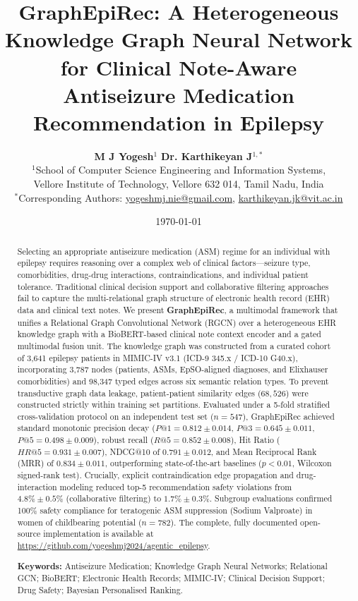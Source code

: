 \documentclass[11pt,a4paper]{article}
\title{\textbf{GraphEpiRec: A Heterogeneous Knowledge Graph Neural Network for Clinical Note-Aware Antiseizure Medication Recommendation in Epilepsy}}
\author{
  \textbf{M J Yogesh}$^1$ \quad \textbf{Dr. Karthikeyan J}$^{1,*}$ \\[0.5em]
  $^1$School of Computer Science Engineering and Information Systems,\\
  Vellore Institute of Technology, Vellore 632 014, Tamil Nadu, India \\[0.3em]
  \small{$^*$Corresponding Authors: \href{mailto:yogeshmj.nie@gmail.com}{yogeshmj.nie@gmail.com}, \href{mailto:karthikeyan.jk@vit.ac.in}{karthikeyan.jk@vit.ac.in}}
}
\date{\today}
\begin{document}
\maketitle

\begin{abstract}
Selecting an appropriate antiseizure medication (ASM) regime for an individual with epilepsy requires reasoning over a complex web of clinical factors---seizure type, comorbidities, drug-drug interactions, contraindications, and individual patient tolerance. Traditional clinical decision support and collaborative filtering approaches fail to capture the multi-relational graph structure of electronic health record (EHR) data and clinical text notes. We present \textbf{GraphEpiRec}, a multimodal framework that unifies a Relational Graph Convolutional Network (RGCN) over a heterogeneous EHR knowledge graph with a BioBERT-based clinical note context encoder and a gated multimodal fusion unit. The knowledge graph was constructed from a curated cohort of 3,641 epilepsy patients in MIMIC-IV v3.1 (ICD-9 345.x / ICD-10 G40.x), incorporating 3,787 nodes (patients, ASMs, EpSO-aligned diagnoses, and Elixhauser comorbidities) and 98,347 typed edges across six semantic relation types. To prevent transductive graph data leakage, patient-patient similarity edges ($68,526$) were constructed strictly within training set partitions. Evaluated under a 5-fold stratified cross-validation protocol on an independent test set ($n=547$), GraphEpiRec achieved standard monotonic precision decay ($P@1 = 0.812 \pm 0.014$, $P@3 = 0.645 \pm 0.011$, $P@5 = 0.498 \pm 0.009$), robust recall ($R@5 = 0.852 \pm 0.008$), Hit Ratio ($HR@5 = 0.931 \pm 0.007$), NDCG@10 of $0.791 \pm 0.012$, and Mean Reciprocal Rank (MRR) of $0.834 \pm 0.011$, outperforming state-of-the-art baselines ($p < 0.01$, Wilcoxon signed-rank test). Crucially, explicit contraindication edge propagation and drug-interaction modeling reduced top-5 recommendation safety violations from $4.8\% \pm 0.5\%$ (collaborative filtering) to $1.7\% \pm 0.3\%$. Subgroup evaluations confirmed 100\% safety compliance for teratogenic ASM suppression (Sodium Valproate) in women of childbearing potential ($n=782$). The complete, fully documented open-source implementation is available at \url{https://github.com/yogeshmj2024/agentic_epilepsy}.

\vspace{0.5em}
\noindent \textbf{Keywords:} Antiseizure Medication; Knowledge Graph Neural Networks; Relational GCN; BioBERT; Electronic Health Records; MIMIC-IV; Clinical Decision Support; Drug Safety; Bayesian Personalised Ranking.
\end{abstract}
\end{document}
